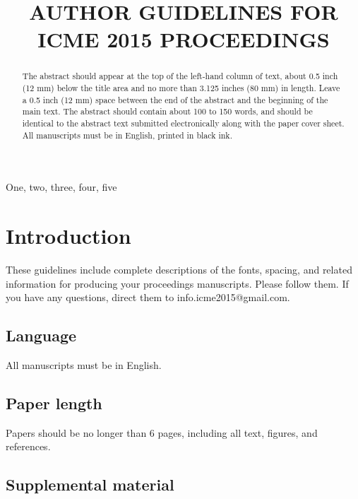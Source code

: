 \documentclass{article}
\begin{document}
\sloppy

\def\x{{\mathbf x}}
\def\L{{\cal L}}


\title{AUTHOR GUIDELINES FOR ICME 2015 PROCEEDINGS}
%
\address{}


\maketitle


%
\begin{abstract}
The abstract should appear at the top of the left-hand column of text, about 0.5 inch (12 mm) below the title area and no more than 3.125 inches (80 mm) in length.  Leave a 0.5 inch (12 mm) space between the end of the abstract and the beginning of the main text.  The abstract should contain about 100 to 150 words, and should be identical to the abstract text submitted electronically along with the paper cover sheet.  All manuscripts must be in English, printed in black ink.
\end{abstract}
%
\begin{keywords}
One, two, three, four, five
\end{keywords}
%
\section{Introduction}
\label{sec:intro}

These guidelines include complete descriptions of the fonts, spacing, and related information for producing your proceedings manuscripts. Please follow them. If you have any questions, direct them to info.icme2015@gmail.com.

\subsection{Language}

All manuscripts must be in English.

\subsection{Paper length}

Papers should be no longer than 6 pages, including all text, figures, and references.

\subsection{Supplemental material}
\end{document}
